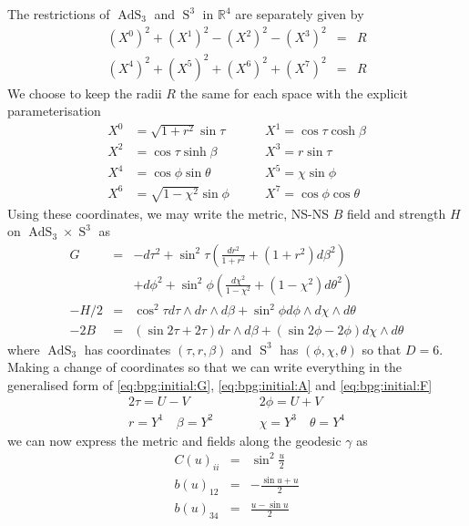 \documentclass[11pt, a4paper, titlepage]{article}
\DeclareMathOperator{\AdS}{AdS}
\DeclareMathOperator{\Sphere}{S}
\let\S\Sphere
\begin{document}
The restrictions of $\AdS_3$ and $\S^3$ in $\mathbb{R}^4$ are separately given by
\begin{eqnarray}
  \label{eq:bpg:ex:jose:ads3}
  \left(X^0\right)^2+\left(X^1\right)^2-\left(X^2\right)^2-\left(X^3\right)^2&=&R\\
  \label{eq:bpg:ex:jose:s3}
  \left(X^4\right)^2+\left(X^5\right)^2+\left(X^6\right)^2+\left(X^7\right)^2&=&R
\end{eqnarray}
We choose to keep the radii $R$ the same for each space with the explicit
parameterisation
\begin{eqnarray}
  \label{eq:bpg:ex:jose:param}
  X^0&=\sqrt{1+r^2}\sin{\tau}    \qquad &X^1=\cos{\tau}\cosh{\beta} \\ \nonumber
  X^2&=\cos{\tau}\sinh{\beta}    \qquad &X^3=r\sin{\tau} \\ \nonumber
  X^4&=\cos{\phi}\sin{\theta}    \qquad &X^5=\chi\sin{\phi} \\ \nonumber
  X^6&=\sqrt{1-\chi^2}\sin{\phi} \qquad &X^7=\cos{\phi}\cos{\theta}
\end{eqnarray}
Using these coordinates, we may write the metric, NS-NS $B$ field and strength $H$
on $\AdS_3\times\S^3$ as
\begin{eqnarray}
  \label{eq:bpg:ex:jose:G}
  G &=& - d\tau^2 + \sin^2{\tau}\left( \frac{dr^2}{1+r^2} +
    \left(1+r^2\right)d\beta^2\right) \\ \nonumber
  &&+d\phi^2+\sin^2{\phi}\left(\frac{d\chi^2}{1-\chi^2}+
    \left(1-\chi^2\right)d\theta^2\right)\\
  \label{eq:bpg:ex:jose:H}
  -H/2 &=& \cos^2{\tau} d\tau\wedge dr\wedge d\beta + \sin^2{\phi}d\phi\wedge
  d\chi\wedge d\theta\\
  \label{eq:bpg:ex:jose:B}
  -2B &=& \left(\sin{2\tau}+2\tau\right)dr\wedge d\beta
  +\left(\sin{2\phi}-2\phi\right)d\chi\wedge d\theta
\end{eqnarray}
where $\AdS_3$ has coordinates $(\tau,r,\beta)$ and $\S^3$ has
$(\phi,\chi,\theta)$ so that $D=6$. Making a change of coordinates so that we
can write everything in the generalised form of \eqref{eq:bpg:initial:G},
\eqref{eq:bpg:initial:A} and \eqref{eq:bpg:initial:F}
\begin{eqnarray}
  \label{eq:bpg:ex:jose:changecoords}
  2\tau=U-V &\qquad& 2\phi=U+V \\ \nonumber
  r=Y^1\quad\beta=Y^2 &\qquad& \chi=Y^3\quad\theta=Y^4
\end{eqnarray}
we can now express the metric and fields along the geodesic $\gamma$ as
\begin{eqnarray}
  \label{eq:bpg:ex:jose:parts}
  C(u)_{ii} &=& \sin^2{\frac{u}{2}} \\ \nonumber
  b(u)_{12}&=&-\frac{\sin{u}+u}{2}\\ \nonumber
  b(u)_{34}&=&\frac{u-\sin{u}}{2}
\end{eqnarray}
\end{document}
